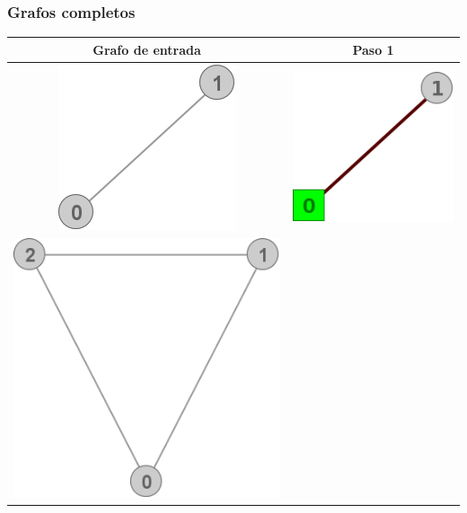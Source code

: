 \subsubsection{Grafos completos}
	\begin{center}
		\begin{tabular}{ |c||c| }
			\hline
			Grafo de entrada & Paso 1 \\
			\hline\hline
			\includegraphics[scale = 0.3]{img/ej3/constructiva_golosa/K2_st0.png} &
			\includegraphics[scale = 0.3]{img/ej3/constructiva_golosa/K2_st1.png} \\
			\hline
			\includegraphics[scale = 0.3]{img/ej3/constructiva_golosa/K3_st0.png} &

\end{tabular}
\end{center}

